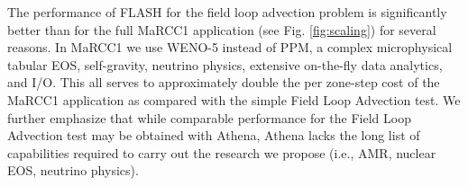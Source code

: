 The performance of FLASH for the field loop advection problem is significantly better than for the full MaRCC1 application (see Fig. \ref{fig:scaling}) for several reasons.
In MaRCC1 we use WENO-5 instead of PPM, a complex microphysical tabular EOS, self-gravity, neutrino physics, extensive on-the-fly data analytics, and I/O.
This all serves to approximately double the per zone-step cost of the MaRCC1 application as compared with the simple Field Loop Advection test.
We further emphasize that while comparable performance for the Field Loop Advection test may be obtained with Athena, Athena lacks the long list of capabilities required to carry out the research we propose (i.e., AMR, nuclear EOS, neutrino physics).

